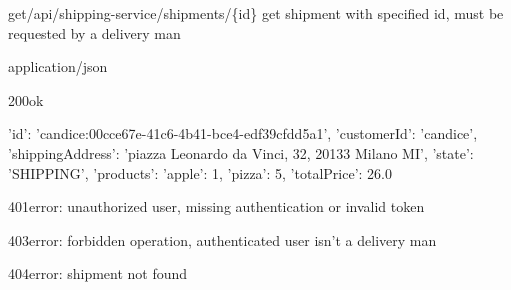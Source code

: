 \begin{apiRoute}{get}{/api/shipping-service/shipments/\{id\}} {get shipment with specified id, must be requested by a delivery man}
	\begin{routeParameter}
	\end{routeParameter}
	\begin{routeResponse}{application/json}
		\begin{routeResponseItem}{200}{ok}
			\begin{routeResponseItemBody}
{   
    'id': 'candice:00cce67e-41c6-4b41-bce4-edf39cfdd5a1',
    'customerId': 'candice',
    'shippingAddress': 'piazza Leonardo da Vinci, 32, 20133 Milano MI',
    'state': 'SHIPPING',
    'products': {'apple': 1, 'pizza': 5},
    'totalPrice': 26.0
}
			\end{routeResponseItemBody}
		\end{routeResponseItem}
	    \begin{routeResponseItem}{401}{error: unauthorized user, missing authentication or invalid token}
    	    \begin{routeResponseItemBody}
			\end{routeResponseItemBody}
		\end{routeResponseItem}
	    \begin{routeResponseItem}{403}{error: forbidden operation, authenticated user isn't a delivery man}
    	    \begin{routeResponseItemBody}
		    \end{routeResponseItemBody}
	    \end{routeResponseItem}	
	    \begin{routeResponseItem}{404}{error: shipment not found}
    		\begin{routeResponseItemBody}
        	\end{routeResponseItemBody} 
		\end{routeResponseItem}
	\end{routeResponse}
\end{apiRoute}

